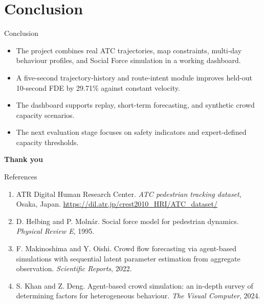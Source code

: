 \documentclass[aspectratio=169]{beamer}
\begin{document}
\section{Conclusion}
\begin{frame}{Conclusion}
\begin{itemize}
\item The project combines real ATC trajectories, map constraints, multi-day behaviour profiles, and Social Force simulation in a working dashboard.
\item A five-second trajectory-history and route-intent module improves held-out 10-second FDE by 29.71\% against constant velocity.
\item The dashboard supports replay, short-term forecasting, and synthetic crowd capacity scenarios.
\item The next evaluation stage focuses on safety indicators and expert-defined capacity thresholds.
\end{itemize}
\vfill
\centering
\Large\color{ATCBlue}\textbf{Thank you}
\end{frame}

\begin{frame}{References}
\footnotesize
\begin{enumerate}
\item ATR Digital Human Research Center. \textit{ATC pedestrian tracking dataset}, Osaka, Japan. \url{https://dil.atr.jp/crest2010_HRI/ATC_dataset/}
\item D. Helbing and P. Moln\'ar. Social force model for pedestrian dynamics. \textit{Physical Review E}, 1995.
\item F. Makinoshima and Y. Oishi. Crowd flow forecasting via agent-based simulations with sequential latent parameter estimation from aggregate observation. \textit{Scientific Reports}, 2022.
\item S. Khan and Z. Deng. Agent-based crowd simulation: an in-depth survey of determining factors for heterogeneous behaviour. \textit{The Visual Computer}, 2024.
\end{enumerate}
\end{frame}
\end{document}
